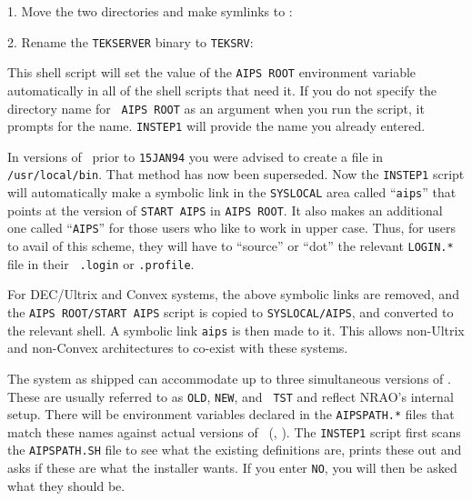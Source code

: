 \item{1.} {Move the two directories and make symlinks to {\tt\thisver}:
\medskip
{}
}
\medskip
\item{2.} {Rename the {\tt TEKSERVER} binary to {\tt TEKSRV}:\medskip
{}
}
\medskip


\medskip{}

This shell script will set the value of the {\tt AIPS ROOT}
environment variable automatically in all of the shell scripts that
need it.  If you do not specify the directory name for {\tt
AIPS ROOT} as an argument when you run the script, it prompts for the
name.  {\tt INSTEP1} will provide the name you already entered.

\medskip{}

In versions of \AIPS\ prior to {\tt 15JAN94} you were advised to create a
file in {\tt /usr/local/bin}.  That method has now been superseded.  Now
the {\tt INSTEP1} script will automatically make a symbolic link in the
{\tt\dol SYSLOCAL} area called ``{\tt aips}'' that points at the version
of {\tt START AIPS} in {\tt\dol AIPS ROOT}.  It also makes
an additional one called ``{\tt AIPS}'' for those users who like to work
in upper case.  Thus, for users to avail of this scheme, they will have to
``source'' or ``dot'' the relevant {\tt LOGIN.*} file in their {\tt
.login} or {\tt .profile}.

For DEC/Ultrix and Convex systems, the above symbolic links are removed,
and the {\tt\dol AIPS \-ROOT/\-START \-AIPS} script is copied to
{\tt\dol SYSLOCAL/AIPS}, and converted to the relevant shell.  A symbolic
link {\tt aips} is then made to it.  This allows non-Ultrix and non-Convex
architectures to co-exist with these systems.

\medskip{}

The system as shipped can accommodate up to three simultaneous versions of
\AIPS.  These are usually referred to as {\tt OLD}, {\tt NEW}, and {\tt
TST} and reflect NRAO's internal setup.  There will be environment
variables declared in the {\tt AIPSPATH.*} files that match these names
against actual versions of \AIPS\ (\eg, {\tt\thisver}).  The {\tt INSTEP1}
script first scans the {\tt AIPSPATH.SH} file to see what the existing
definitions are, prints these out and asks if these are what the installer
wants.  If you enter {\tt NO}, you will then be asked what they should be.

